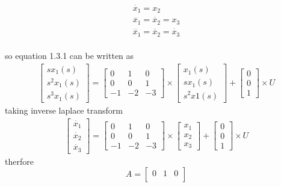 \begin{enumerate}[label=\thesection.\arabic*.,ref=\thesection.\theenumi]
\begin{align*}
\end{align*}
\begin{align*}
\dot{x_{1}}=x_{2} \\ 
\ddot{x_{1}}=\dot{x_{2}}=x_{3} \\ 
\dddot{x_{1}}=\ddot{x_{2}}=\dot{x_{3}}
\end{align*}
\\ so equation 1.3.1 can be written as
\\
\begin{gather*}
\begin{bmatrix}
sx_{1}(s)\\
s^2x_{1}(s)\\
s^3x_{1}(s)
\end{bmatrix}
=
\begin{bmatrix}
0&1&0\\
0&0&1\\
-1&-2&-3
\end{bmatrix}\times \begin{bmatrix}
x_{1}(s)\\
sx_{1}(s)\\
s^2x{1}(s)
\end{bmatrix}
+
\begin{bmatrix}
0\\
0\\
1
\end{bmatrix} \times U
\end{gather*}
taking inverse laplace transform
\begin{gather*}
\begin{bmatrix}
\dot{x_{1}}\\
\dot{x_{2}}\\
\dot{x_{3}}
\end{bmatrix}
=
\begin{bmatrix}
0&1&0\\
0&0&1\\
-1&-2&-3
\end{bmatrix}\times \begin{bmatrix}
x_{1}\\
x_{2}\\
x_{3}
\end{bmatrix}
+
\begin{bmatrix}
0\\
0\\
1
\end{bmatrix} \times U
\end{gather*}
therfore
\begin{equation*}
A=\begin{bmatrix}
0&1&0\\

\end{bmatrix}
\end{equation*}
\end{enumerate}
